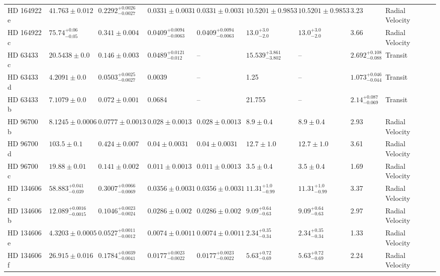 \begin{tabular}{llllllllll}
HD 164922 e & $41.763 \pm 0.012$ & $0.2292^{+0.0026}_{-0.0027}$ & $0.0331 \pm 0.0031$ & $0.0331 \pm 0.0031$ & $10.5201 \pm 0.9853$ & $10.5201 \pm 0.9853$ & 3.23 & Radial Velocity & \cite{ROSENTHAL_ET_AL__2021} \\
HD 164922 c & $75.74^{+0.06}_{-0.05}$ & $0.341 \pm 0.004$ & $0.0409^{+0.0094}_{-0.0063}$ & $0.0409^{+0.0094}_{-0.0063}$ & $13.0^{+3.0}_{-2.0}$ & $13.0^{+3.0}_{-2.0}$ & 3.66 & Radial Velocity & \cite{BENATTI_ET_AL__2020} \\
HD 63433 c & $20.5438 \pm 0.0$ & $0.146 \pm 0.003$ & $0.0489^{+0.0121}_{-0.012}$ & -- & $15.539^{+3.861}_{-3.802}$ & -- & $2.692^{+0.108}_{-0.088}$ & Transit & \cite{MALLORQU_AMP_IACUTE_N_ET_AL__2023} \\
HD 63433 d & $4.2091 \pm 0.0$ & $0.0503^{+0.0025}_{-0.0027}$ & 0.0039 & -- & 1.25 & -- & $1.073^{+0.046}_{-0.044}$ & Transit & \cite{CAPISTRANT_ET_AL_2024} \\
HD 63433 b & $7.1079 \pm 0.0$ & $0.072 \pm 0.001$ & 0.0684 & -- & 21.755 & -- & $2.14^{+0.087}_{-0.069}$ & Transit & \cite{MALLORQU_AMP_IACUTE_N_ET_AL__2023} \\
HD 96700 b & $8.1245 \pm 0.0006$ & $0.0777 \pm 0.0013$ & $0.028 \pm 0.0013$ & $0.028 \pm 0.0013$ & $8.9 \pm 0.4$ & $8.9 \pm 0.4$ & 2.93 & Radial Velocity & \cite{UNGER_ET_AL__2021} \\
HD 96700 d & $103.5 \pm 0.1$ & $0.424 \pm 0.007$ & $0.04 \pm 0.0031$ & $0.04 \pm 0.0031$ & $12.7 \pm 1.0$ & $12.7 \pm 1.0$ & 3.61 & Radial Velocity & \cite{UNGER_ET_AL__2021} \\
HD 96700 c & $19.88 \pm 0.01$ & $0.141 \pm 0.002$ & $0.011 \pm 0.0013$ & $0.011 \pm 0.0013$ & $3.5 \pm 0.4$ & $3.5 \pm 0.4$ & 1.69 & Radial Velocity & \cite{UNGER_ET_AL__2021} \\
HD 134606 c & $58.883^{+0.041}_{-0.039}$ & $0.3007^{+0.0066}_{-0.0069}$ & $0.0356 \pm 0.0031$ & $0.0356 \pm 0.0031$ & $11.31^{+1.0}_{-0.99}$ & $11.31^{+1.0}_{-0.99}$ & 3.37 & Radial Velocity & \cite{LI_ET_AL_2024} \\
HD 134606 b & $12.089^{+0.0016}_{-0.0015}$ & $0.1046^{+0.0023}_{-0.0024}$ & $0.0286 \pm 0.002$ & $0.0286 \pm 0.002$ & $9.09^{+0.64}_{-0.63}$ & $9.09^{+0.64}_{-0.63}$ & 2.97 & Radial Velocity & \cite{LI_ET_AL_2024} \\
HD 134606 e & $4.3203 \pm 0.0005$ & $0.0527^{+0.0011}_{-0.0012}$ & $0.0074 \pm 0.0011$ & $0.0074 \pm 0.0011$ & $2.34^{+0.35}_{-0.34}$ & $2.34^{+0.35}_{-0.34}$ & 1.33 & Radial Velocity & \cite{LI_ET_AL_2024} \\
HD 134606 f & $26.915 \pm 0.016$ & $0.1784^{+0.0039}_{-0.0041}$ & $0.0177^{+0.0023}_{-0.0022}$ & $0.0177^{+0.0023}_{-0.0022}$ & $5.63^{+0.72}_{-0.69}$ & $5.63^{+0.72}_{-0.69}$ & 2.24 & Radial Velocity & \cite{LI_ET_AL_2024} \\

\end{tabular}
